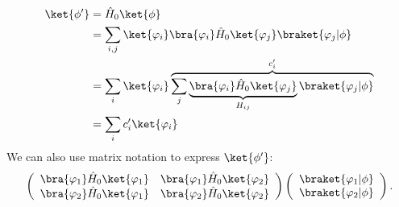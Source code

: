 			\begin{align}
				\ket{\phi'} &=\hat{H}_0 \ket{\phi}\\ 
				&= \sum\limits_{i,j} \ket{\varphi_i}\bra{\varphi_i} \hat{H}_0 \ket{\varphi_j}\braket{\varphi_j|\phi}\\
				&= \sum\limits_i \ket{\varphi_i} \overbrace{\sum\limits_j  \underbrace{\bra{\varphi_i} \hat{H}_0 \ket{\varphi_j} }_{H_{ij}}  \braket{\varphi_j|\phi}}^{c_i'}\\
				&= \sum_i c_i' \ket{\varphi_i}
			\end{align}
			We can also use matrix notation to express $\ket{\phi'}$:
			\begin{align}
				\left( \begin{array}{cc} \bra{\varphi_1}\hat{H}_0\ket{\varphi_1} & \bra{\varphi_1}\hat{H}_0\ket{\varphi_2} \\ \bra{\varphi_2}\hat{H}_0\ket{\varphi_1} & \bra{\varphi_2}\hat{H}_0\ket{\varphi_2} \end{array} \right)\left( \begin{array}{c} \braket{\varphi_1 | \phi} \\ \braket{\varphi_2|\phi} \end{array} \right).
			\end{align}

